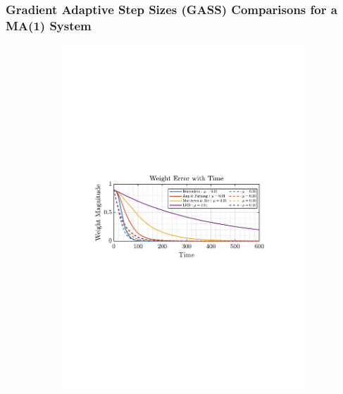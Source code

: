 \documentclass[12pt]{article}
\begin{document}
		\subsubsection{Gradient Adaptive Step Sizes (GASS) Comparisons for a MA(1) System} 
			\begin{figure}[H]
				\centering
				\begin{subfigure}{0.49\textwidth}
					\centering
					\includegraphics[trim={2.2cm 11.2cm 3.15cm  11.2cm}, clip, width=\textwidth]{../MATLAB/figures/q2_2a_fig03.pdf} 
					\captionsetup{justification=centering}
				\end{subfigure}
				\begin{subfigure}{0.49\textwidth}
					\centering

\end{subfigure}
\end{figure}
\end{document}
